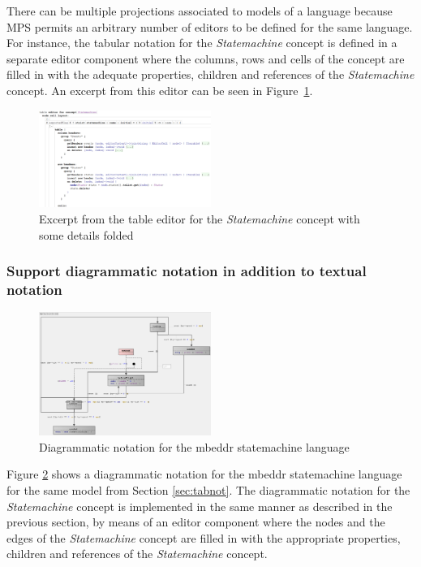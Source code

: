 \documentclass[preprint,numbers,10pt]{sigplanconf}
\begin{document}
There can be multiple projections associated to models of a language because MPS permits an arbitrary
number of editors to be defined for the same language.
For instance, the tabular notation for the \emph{Statemachine} concept is defined
in a separate editor component where the columns, rows and cells of the concept are filled in
with the adequate properties, children and references of the \emph{Statemachine} concept.
An excerpt from this editor can be seen in Figure~\ref{fig:TableEditorStatemachine}.

\begin{figure}[H]
	\centering
	\includegraphics[width=0.50\textwidth]{screens/TableEditorStatemachine.png}
	\caption{Excerpt from the table editor for the \emph{Statemachine} concept with some details folded}
	\label{fig:TableEditorStatemachine}
\end{figure}

\subsubsection{Support diagrammatic notation in addition to textual notation}\label{sec:dianot}
\begin{figure}[H]
	\centering
	\includegraphics[width=0.50\textwidth]{screens/DiagrammaticNotationStatemachines.png}
	\caption{Diagrammatic notation for the mbeddr statemachine
	language}
	\label{fig:dianotationsm}
\end{figure}

Figure \ref{fig:dianotationsm} shows a diagrammatic notation for the mbeddr
statemachine language for the same model from Section \ref{sec:tabnot}.
The diagrammatic notation for the \emph{Statemachine} concept is implemented in the same manner as described in the previous section,
by means of an editor component where the nodes and the edges of the \emph{Statemachine} concept
are filled in with the appropriate properties, children and references of the \emph{Statemachine} concept.
\end{document}
